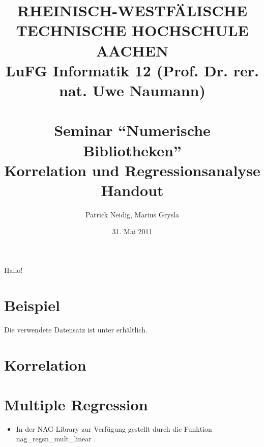 \documentclass[a4paper]{article}
\title{
{\bf \scriptsize RHEINISCH-WESTF\"ALISCHE TECHNISCHE HOCHSCHULE AACHEN \\
LuFG Informatik 12 (Prof. Dr. rer. nat. Uwe Naumann)}\\
~\\
Seminar ``Numerische Bibliotheken''\\
{\bf \Large Korrelation und Regressionsanalyse} \\
{\large Handout} 
}
\author{Patrick Neidig, Marius Grysla}
\date{31. Mai 2011}
\begin{document}
\maketitle

Hallo!\cite{Cramer2007}\cite{Golub1989}

\section{Beispiel}
Die verwendete Datensatz ist unter \cite{Fahrmeier2011} erhältlich.

\section{Korrelation}

\section{Multiple Regression}

\begin{itemize}
\item In der NAG-Library zur Verfügung gestellt durch die Funktion nag\_regsn\_mult\_linear \cite{nag:intro}.
\end{itemize}



\end{document}

